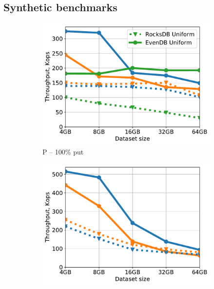\subsection{Synthetic benchmarks}
\label{ssec:synthetic} 

\begin{figure}[tb]
\centering
\begin{subfigure}{0.3\linewidth}
\includegraphics[width=\textwidth]{figs/Workload_P_line.pdf}
\caption{P -- 100\% put}
\label{fig:throughput:p}
\end{subfigure}
\hspace{0.01\linewidth} 
\begin{subfigure}{0.3\linewidth}
\includegraphics[width=\textwidth]{figs/Workload_A_line.pdf}

\end{subfigure}
\end{figure}
